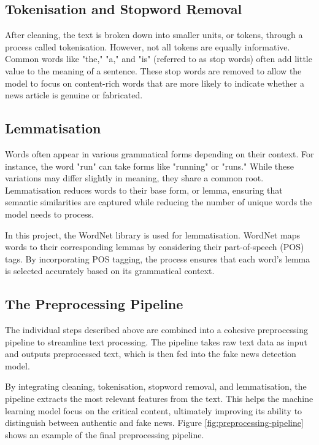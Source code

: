 \documentclass[sn-mathphys-ay, Numbered]{sn-jnl}
\theoremstyle{thmstyleone}%
\theoremstyle{thmstyletwo}%
\theoremstyle{thmstylethree}%
\begin{document}
\subsection{Tokenisation and Stopword Removal}
After cleaning, the text is broken down into smaller units, or tokens, through a process called tokenisation. However, not all tokens are equally informative. Common words like "the," "a," and "is" (referred to as stop words) often add little value to the meaning of a sentence. These stop words are removed to allow the model to focus on content-rich words that are more likely to indicate whether a news article is genuine or fabricated.

\subsection{Lemmatisation}
Words often appear in various grammatical forms depending on their context. For instance, the word "run" can take forms like "running" or "runs." While these variations may differ slightly in meaning, they share a common root. Lemmatisation reduces words to their base form, or lemma, ensuring that semantic similarities are captured while reducing the number of unique words the model needs to process.

In this project, the WordNet library is used for lemmatisation. WordNet maps words to their corresponding lemmas by considering their part-of-speech (POS) tags. By incorporating POS tagging, the process ensures that each word's lemma is selected accurately based on its grammatical context.

\subsection{The Preprocessing Pipeline}
The individual steps described above are combined into a cohesive preprocessing pipeline to streamline text processing. The pipeline takes raw text data as input and outputs preprocessed text, which is then fed into the fake news detection model.

By integrating cleaning, tokenisation, stopword removal, and lemmatisation, the pipeline extracts the most relevant features from the text. This helps the machine learning model focus on the critical content, ultimately improving its ability to distinguish between authentic and fake news. Figure \ref{fig:preprocessing-pipeline} shows an example of the final preprocessing pipeline.
\end{document}
